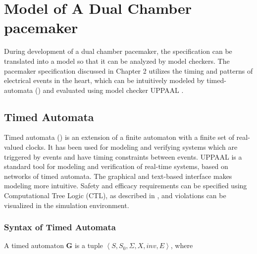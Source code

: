 %
%
\section{Model of A Dual Chamber pacemaker}
During development of a dual chamber pacemaker, the specification can be translated into a model so that it can be analyzed by model checkers.
The pacemaker specification discussed in Chapter 2 utilizes the timing and patterns of electrical events in the heart, which can be intuitively modeled by timed-automata (\cite{timed_automata}) and evaluated using model checker UPPAAL \cite{uppaal}.
\subsection{Timed Automata}
Timed automata (\cite{timed_automata}) is an extension of a finite automaton with a finite set of real-valued clocks. 
It has been used for modeling and verifying systems which are triggered by events and have timing constraints between events. 
UPPAAL is a standard tool for modeling and verification of real-time systems, based on networks of timed automata. 
The graphical and text-based interface makes modeling more intuitive. 
Safety and efficacy requirements can be specified using Computational Tree Logic (CTL), as described in \cite{Clarke}, and violations can be visualized in the simulation environment.

\subsubsection{Syntax of Timed Automata}
A timed automaton \textbf{G} is a tuple $\left\langle S,S_0,\Sigma,X,inv,E\right\rangle$, where

